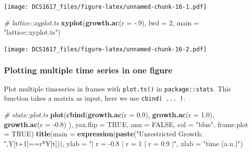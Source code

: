 \documentclass[]{book}
\newenvironment{Shaded}{\begin{snugshade}}{\end{snugshade}}
\newcommand{\KeywordTok}[1]{\textcolor[rgb]{0.13,0.29,0.53}{\textbf{{#1}}}}
\newcommand{\DataTypeTok}[1]{\textcolor[rgb]{0.13,0.29,0.53}{{#1}}}
\newcommand{\DecValTok}[1]{\textcolor[rgb]{0.00,0.00,0.81}{{#1}}}
\newcommand{\FloatTok}[1]{\textcolor[rgb]{0.00,0.00,0.81}{{#1}}}
\newcommand{\StringTok}[1]{\textcolor[rgb]{0.31,0.60,0.02}{{#1}}}
\newcommand{\CommentTok}[1]{\textcolor[rgb]{0.56,0.35,0.01}{\textit{{#1}}}}
\newcommand{\OtherTok}[1]{\textcolor[rgb]{0.56,0.35,0.01}{{#1}}}
\newcommand{\NormalTok}[1]{{#1}}
\begin{document}
\texttt{[image: DCS1617\_files/figure-latex/unnamed-chunk-16-1.pdf]}

\begin{Shaded}
\begin{Highlighting}[]
\CommentTok{# lattice::xyplot.ts}
\KeywordTok{xyplot}\NormalTok{(}\KeywordTok{growth.ac}\NormalTok{(}\DataTypeTok{r =} \NormalTok{-.}\DecValTok{9}\NormalTok{), }\DataTypeTok{lwd =} \DecValTok{2}\NormalTok{, }\DataTypeTok{main =} \StringTok{"lattice::xyplot.ts"}\NormalTok{)}
\end{Highlighting}
\end{Shaded}

\texttt{[image: DCS1617\_files/figure-latex/unnamed-chunk-16-2.pdf]}

\subsubsection*{Plotting multiple time series in one
figure}\label{plotting-multiple-time-series-in-one-figure}

Plot multiple timeseries in frames with \texttt{plot.ts()} in
\texttt{package::stats}. This function takes a matrix as input, here we
use \texttt{cbind(\ ...\ )}.

\begin{Shaded}
\begin{Highlighting}[]
\CommentTok{# stats::plot.ts  }
\KeywordTok{plot}\NormalTok{(}\KeywordTok{cbind}\NormalTok{(}\KeywordTok{growth.ac}\NormalTok{(}\DataTypeTok{r =}  \FloatTok{0.9}\NormalTok{),}
           \KeywordTok{growth.ac}\NormalTok{(}\DataTypeTok{r =}  \FloatTok{1.0}\NormalTok{), }
           \KeywordTok{growth.ac}\NormalTok{(}\DataTypeTok{r =} \NormalTok{-}\FloatTok{0.8}\NormalTok{)}
           \NormalTok{), }
     \DataTypeTok{yax.flip =} \OtherTok{TRUE}\NormalTok{, }\DataTypeTok{ann =} \OtherTok{FALSE}\NormalTok{, }\DataTypeTok{col =} \StringTok{"blue"}\NormalTok{, }\DataTypeTok{frame.plot =} \OtherTok{TRUE}\NormalTok{) }
\KeywordTok{title}\NormalTok{(}\DataTypeTok{main =} \KeywordTok{expression}\NormalTok{(}\KeywordTok{paste}\NormalTok{(}\StringTok{"Unrestricted Growth: "}\NormalTok{,Y[t}\DecValTok{+1}\NormalTok{]==r*Y[t])), }
      \DataTypeTok{ylab =} \StringTok{"|  r = -0.8  |  r = 1  |  r = 0.9  |"}\NormalTok{, }
      \DataTypeTok{xlab =} \StringTok{"time (a.u.)"}\NormalTok{)}
\end{Highlighting}
\end{Shaded}
\end{document}
